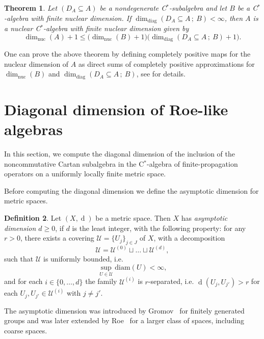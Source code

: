 \documentclass[a4paper]{amsart}
\newcommand{\myhyp}{\textnormal{-}\hskip0pt\relax}
\numberwithin{equation}{section}
\newcommand{\Ucal}{\mathcal{U}}
\newcommand{\cstar}{C$^\ast$\myhyp{}algebra}
\newcommand{\cstarSub}{C$^\ast$\myhyp{}subalgebra}
\newcommand{\prn}[1]{{(#1)}}
\DeclareMathOperator{\dist}{d}
\newcommand{\diam}[1]{\mathrm{diam} ({#1})}
\newcommand{\dimnuc}[1]{\dim_{\mathrm{nuc}}({#1})}
\newcommand{\ddimn}[3]{\dim_{\mathrm{diag}}({#1}\subseteq{#2}\, ;~{#3})}
\theoremstyle{plain}
\newtheorem{thm}{Theorem}[section]
\theoremstyle{indented}
\numberwithin{equation}{section}
\theoremstyle{definition}
\newtheorem{defin}[thm]{Definition}
\theoremstyle{remark}
\theoremstyle{plain}
\theoremstyle{definition}
\begin{document}
\begin{thm}
    Let ${(D_A \subseteq A)}$ be a nondegenerate \cstarSub{} and let $B$ be a \cstar{} with finite nuclear dimension. 
    If ${\ddimn{D_A}{A}{B}< \infty}$, then $A$ is a nuclear \cstar{} with finite nuclear dimension given by
    \begin{equation*}
        \dimnuc{A} + 1 \le \big(\dimnuc{B}+1\big)\big(\ddimn{D_A}{A}{B}+1\big).
    \end{equation*}
\end{thm}

One can prove the above theorem by defining
completely positive maps for the nuclear dimension of $A$
as direct sums of completely positive approximations for ${\dimnuc{B}}$ and ${\ddimn{D_A}{A}{B}}$, 
see \cite{Kitsios2025PhDThesis} for details.


\bigskip
\section{Diagonal dimension of Roe\myhyp{}like algebras} \label{section:diagDimRoeAlg}

In this section, we 
compute the diagonal dimension of the inclusion of the noncommutative Cartan subalgebra in the \cstar{} of finite\myhyp{}propagation operators on a uniformly locally finite metric space.

Before computing the diagonal dimension we define the asymptotic dimension for metric spaces. 

\begin{defin} \label{def:asDim}
    Let ${(X, \dist)}$ be a metric space.
    Then
$X$ has \emph{asymptotic dimension ${d \ge 0}$}, if $d$ is the least integer,
with the following property:
for any ${r>0}$, there exists a covering ${\Ucal = \{U_j\}_{j \in J}}$ of $X$,
with a decomposition 
\[\Ucal = \Ucal^{\prn{0}} \sqcup \hdots \sqcup \Ucal^{\prn{d}},\]
such that
$\Ucal$ is uniformly bounded, i.e.
\[\sup_{U \in \Ucal} \diam{U}< \infty, \]
and for each ${i \in \{0,\hdots,d\}}$ the family
${\Ucal^{\prn{i}}}$ is $r$\myhyp{}separated, i.e.
${\dist(U_{j} , U_{j'}) > r}$ for each ${U_{j} , U_{j'} \in \Ucal^{\prn{i}}}$ with ${j \ne j'}$. 
\end{defin}

The asymptotic dimension was introduced by Gromov~\cite{Gromov1993AsymptoticInvariantsInfiniteGroups}
for finitely generated groups and 
was later extended by Roe~\cite{Roe2003lecturesCrsGeometry} for a larger class of spaces, including coarse spaces.
\end{document}
